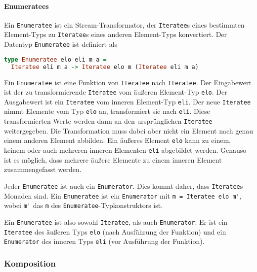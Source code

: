 \documentclass[draft=false
              ,paper=a4
              ,twoside=false
              ,fontsize=11pt
              ,headsepline
              ,BCOR10mm
              ,DIV11
              ]{scrbook}
\begin{document}
\paragraph{Enumeratees} %
\label{par:enumeratees}\mbox{} %

Ein \lstinline|Enumeratee| ist ein Stream-Transformator, der \lstinline|Iteratee|s eines bestimmten Element-Typs zu \lstinline|Iteratee|s eines anderen Element-Typs konvertiert.
Der Datentyp \lstinline|Enumeratee| ist definiert als
\begin{lstlisting}[language=Haskell]
type Enumeratee elo eli m a =
  Iteratee eli m a -> Iteratee elo m (Iteratee eli m a)
\end{lstlisting}

Ein \lstinline|Enumeratee| ist eine Funktion von \lstinline|Iteratee| nach \lstinline|Iteratee|.
Der Eingabewert ist der zu transformierende \lstinline|Iteratee| vom äußeren Element-Typ \lstinline|elo|.
Der Ausgabewert ist ein \lstinline|Iteratee| vom inneren Element-Typ \lstinline|eli|.
Der neue \lstinline|Iteratee| nimmt Elemente vom Typ \lstinline|elo| an, transformiert sie nach \lstinline|eli|.
Diese transformierten Werte werden dann an den ursprünglichen \lstinline|Iteratee| weitergegeben.
Die Transformation muss dabei aber nicht ein Element nach genau einem anderen Element abbilden.
Ein äußeres Element \lstinline|elo| kann zu einem, keinem oder auch mehreren inneren Elementen \lstinline|eli| abgebildet werden.
Genauso ist es möglich, dass mehrere äußere Elemente zu einem inneren Element zusammengefasst werden.

Jeder \lstinline|Enumeratee| ist auch ein \lstinline|Enumerator|.
Dies kommt daher, dass \lstinline|Iteratee|s Monaden sind.
Ein \lstinline|Enumeratee| ist ein \lstinline|Enumerator| mit \lstinline|m = Iteratee elo m'|, wobei \lstinline|m'| das \lstinline|m| des \lstinline|Enumeratee|-Typkonstruktors ist.

Ein \lstinline|Enumeratee| ist also sowohl \lstinline|Iteratee|, als auch \lstinline|Enumerator|.
Er ist ein \lstinline|Iteratee| des äußeren Typs \lstinline|elo| (nach Ausführung der Funktion) und ein \lstinline|Enumerator| des inneren Typs \lstinline|eli| (vor Ausführung der Funktion).





\subsubsection{Komposition} %
\label{ssub:komposition}
\end{document}

